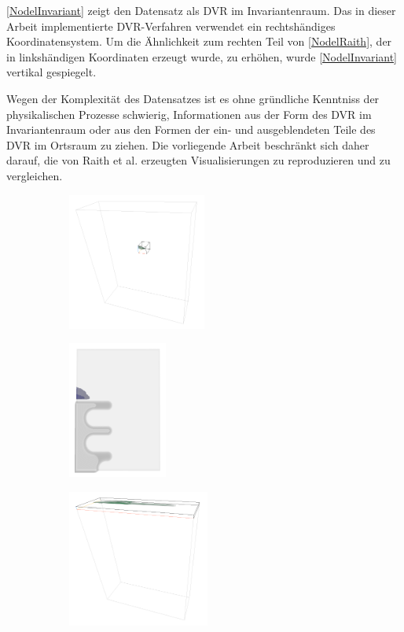 \documentclass[a4paper,fontsize=12pt,toc=bib,halfparskip,ngerman]{scrartcl}
\begin{document}
\cref{NodelInvariant} zeigt den Datensatz als DVR im Invariantenraum. Das in dieser Arbeit implementierte DVR-Verfahren verwendet ein rechtsh\"andiges Koordinatensystem. Um die \"Ahnlichkeit zum rechten Teil von \cref{NodelRaith}, der in linksh\"andigen Koordinaten erzeugt wurde, zu erh\"ohen, wurde \cref{NodelInvariant} vertikal gespiegelt. 

Wegen der Komplexit\"at des Datensatzes ist es ohne gr\"undliche Kenntniss der physikalischen Prozesse schwierig, Informationen aus der Form des DVR im Invariantenraum oder aus den Formen der ein- und ausgeblendeten Teile des DVR im Ortsraum zu ziehen. Die vorliegende Arbeit beschr\"ankt sich daher darauf, die von Raith et al. erzeugten Visualisierungen zu reproduzieren und zu vergleichen.

\begin{figure}
	\begin{subfigure}{0.49\textwidth}
		\centering
		\includegraphics[height=4.5cm]{pictures/results/Nodel/Nodel_InvariantSpace1.png}
		\subcaption{}
		\label{}
	\end{subfigure}
	\hspace*{\fill}
	\begin{subfigure}{0.49\textwidth}
		\centering
		\includegraphics[height=4.5cm]{pictures/results/Nodel/Nodel_Object1.png}
		\subcaption{}
		\label{}
	\end{subfigure}
	\medskip
	\begin{subfigure}{0.49\textwidth}
		\centering
		\includegraphics[height=4.5cm]{pictures/results/Nodel/Nodel_InvariantSpace2.png}

\end{subfigure}
\end{figure}
\end{document}
